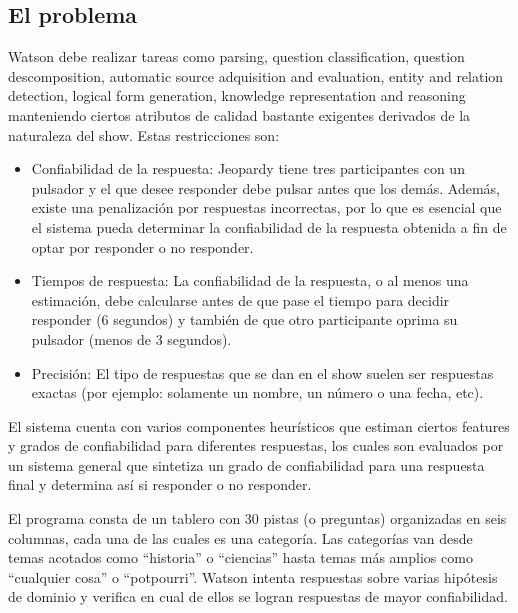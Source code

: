 \subsection{El problema}

Watson debe realizar tareas como parsing, question classification,
question descomposition, automatic source adquisition and evaluation,
entity and relation detection, logical form generation, knowledge
representation and reasoning manteniendo ciertos atributos de calidad
bastante exigentes derivados de la naturaleza del show. Estas
restricciones son:

\begin{itemize}
\item Confiabilidad de la respuesta: \newline
Jeopardy tiene tres participantes con un pulsador y el que desee
responder debe pulsar antes que los dem\'as. Adem\'as, existe una
penalizaci\'on por respuestas incorrectas, por lo que es esencial que
el sistema pueda determinar la confiabilidad de la respuesta obtenida a
fin de optar por responder o no responder.
\item Tiempos de respuesta: \newline
La confiabilidad de la respuesta, o al menos una estimaci\'on, debe
calcularse antes de que pase el tiempo para decidir responder (6
segundos) y tambi\'en de que otro participante oprima su pulsador
(menos de 3 segundos).
\item Precisi\'on:\newline
El tipo de respuestas que se dan en el show suelen ser respuestas
exactas (por ejemplo: solamente un nombre, un n\'umero o una fecha,
etc). 
\end{itemize}

\bigskip

El sistema cuenta con varios componentes heur\'isticos que estiman
ciertos features y grados de confiabilidad para diferentes respuestas,
los cuales son evaluados por un sistema general que sintetiza un grado
de confiabilidad para una respuesta final y determina as\'i si
responder o no responder. 

El programa consta de un tablero con 30 pistas (o preguntas) organizadas
en seis columnas, cada una de las cuales es una categor\'ia. Las
categor\'ias van desde temas acotados como
{\textquotedblleft}historia{\textquotedblright} o
{\textquotedblleft}ciencias{\textquotedblright} hasta temas m\'as
amplios como {\textquotedblleft}cualquier cosa{\textquotedblright} o
{\textquotedblleft}potpourri{\textquotedblright}. Watson intenta
respuestas sobre varias hip\'otesis de dominio y verifica en cual de
ellos se logran respuestas de mayor confiabilidad. 

